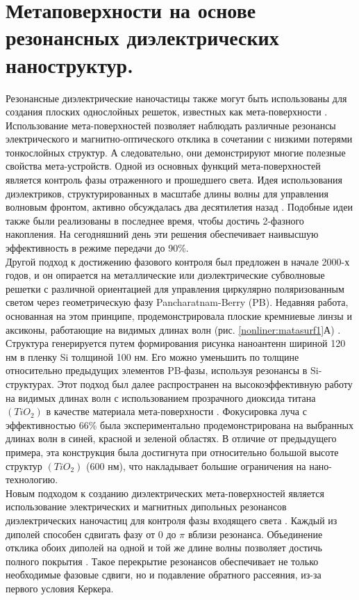 \section{Метаповерхности на основе резонансных диэлектрических наноструктур.}
\hspace*{2mm}
Резонансные диэлектрические наночастицы также могут быть использованы для создания плоских однослойных решеток, известных как мета-поверхности \cite{yu2014flat}. Использование мета-поверхностей позволяет наблюдать различные резонансы  электрического и магнитно-оптического отклика в сочетании с низкими потерями тонкослойных структур. А следовательно, они демонстрируют многие полезные свойства мета-устройств. Одной из основных функций мета-поверхностей является контроль фазы отраженного и прошедшего света. Идея использования диэлектриков, структурированных в масштабе длины волны для управления волновым фронтом, активно обсуждалась два десятилетия назад \cite{lalanne1999design}. Подобные идеи также были реализованы в последнее время, чтобы достичь 2-фазного накопления.  На сегодняшний день эти решения обеспечивает наивысшую эффективность в режиме передачи до 90\%.
\\
\hspace*{2mm}
Другой подход к достижению фазового контроля был предложен в начале 2000-х годов, и он опирается на металлические или диэлектрические субволновые решетки с различной ориентацией для управления циркулярно поляризованным светом через геометрическую фазу Pancharatnam-Berry (PB). Недавняя работа, основанная на этом принципе, продемонстрировала плоские кремниевые линзы и аксиконы, работающие на видимых длинах волн (рис.  \ref{nonliner:matasurf1}А) \cite{lin2014dielectric}. Структура генерируется путем формирования рисунка наноантенн шириной 120 нм в пленку Si толщиной 100 нм. Его можно уменьшить по толщине относительно предыдущих элементов PB-фазы, используя резонансы в Si-структурах. Этот подход был далее распространен на высокоэффективную работу на видимых длинах волн с использованием прозрачного диоксида титана $(TiO_{2})$ в качестве материала мета-поверхности \cite{DiffLimFoc}. Фокусировка луча с эффективностью 66\%  была экспериментально продемонстрирована  на выбранных длинах волн в синей, красной и зеленой областях. В отличие от предыдущего примера, эта конструкция была достигнута при относительно большой высоте структур $(TiO_{2})$ (600 нм), что накладывает большие ограничения на нано-технологию.
\\
\hspace*{2mm}
Новым подходом к созданию диэлектрических мета-поверхностей является использование электрических и магнитных дипольных резонансов диэлектрических наночастиц для контроля фазы входящего света \cite{shalaev2015high}. Каждый из диполей способен сдвигать фазу от 0 до $\pi$ вблизи резонанса. Объединение отклика обоих диполей на одной и той же длине волны позволяет достичь полного покрытия \cite{decker2015high}. Такое перекрытие резонансов обеспечивает не только необходимые фазовые сдвиги, но и подавление обратного рассеяния, из-за первого условия Керкера.
